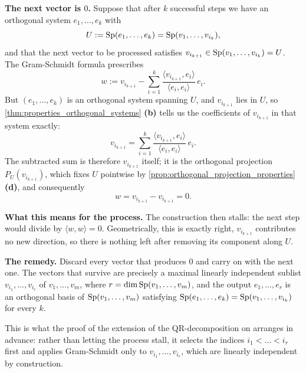 \begin{exercisesolution*}
\label{sol:gram_schmidt_dependent}
  \textbf{The next vector is $0$.} Suppose that after $k$ successful steps we have an orthogonal system $e_1, \dots, e_k$ with
  \[ U := \operatorname{Sp}(e_1, \dots, e_k) = \operatorname{Sp}(v_1, \dots, v_{i_k}), \]
  and that the next vector to be processed satisfies $v_{i_{k+1}} \in \operatorname{Sp}(v_1, \dots, v_{i_k}) = U$. The Gram-Schmidt formula prescribes
  \[ w := v_{i_{k+1}} - \sum_{i=1}^{k} \frac{\langle v_{i_{k+1}}, e_i \rangle}{\langle e_i, e_i \rangle} \, e_i . \]
  But $(e_1, \dots, e_k)$ is an orthogonal system spanning $U$, and $v_{i_{k+1}}$ lies in $U$, so \cref{thm:properties_orthogonal_systems} \textbf{(b)} tells us the coefficients of $v_{i_{k+1}}$ in that system exactly:
  \[ v_{i_{k+1}} = \sum_{i=1}^{k} \frac{\langle v_{i_{k+1}}, e_i \rangle}{\langle e_i, e_i \rangle} \, e_i . \]
  The subtracted sum is therefore $v_{i_{k+1}}$ itself; it is the orthogonal projection $P_U(v_{i_{k+1}})$, which fixes $U$ pointwise by \cref{prop:orthogonal_projection_properties} \textbf{(d)}, and consequently
  \[ w = v_{i_{k+1}} - v_{i_{k+1}} = 0 . \]

  \textbf{What this means for the process.} The construction then stalls: the next step would divide by $\langle w, w \rangle = 0$. Geometrically, this is exactly right, $v_{i_{k+1}}$ contributes no new direction, so there is nothing left after removing its component along $U$.

  \textbf{The remedy.} Discard every vector that produces $0$ and carry on with the next one. The vectors that survive are precisely a maximal linearly independent sublist $v_{i_1}, \dots, v_{i_r}$ of $v_1, \dots, v_m$, where $r = \dim \operatorname{Sp}(v_1, \dots, v_m)$, and the output $e_1, \dots, e_r$ is an orthogonal basis of $\operatorname{Sp}(v_1, \dots, v_m)$ satisfying $\operatorname{Sp}(e_1, \dots, e_k) = \operatorname{Sp}(v_1, \dots, v_{i_k})$ for every $k$.

  This is what the proof of the extension of the QR-decomposition on  arranges in advance: rather than letting the process stall, it selects the indices $i_1 < \dots < i_r$ first and applies Gram-Schmidt only to $v_{i_1}, \dots, v_{i_r}$, which are linearly independent by construction.
\end{exercisesolution*}



